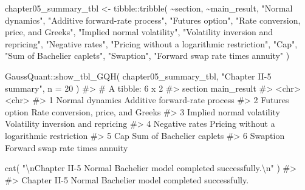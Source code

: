 \documentclass[
  letterpaper,
  DIV=11,
  numbers=noendperiod]{scrreprt}
\newenvironment{Shaded}{\begin{snugshade}}{\end{snugshade}}
\newcommand{\AttributeTok}[1]{\textcolor[rgb]{0.40,0.45,0.13}{#1}}
\newcommand{\CommentTok}[1]{\textcolor[rgb]{0.37,0.37,0.37}{#1}}
\newcommand{\DecValTok}[1]{\textcolor[rgb]{0.68,0.00,0.00}{#1}}
\newcommand{\FunctionTok}[1]{\textcolor[rgb]{0.28,0.35,0.67}{#1}}
\newcommand{\NormalTok}[1]{\textcolor[rgb]{0.00,0.23,0.31}{#1}}
\newcommand{\OtherTok}[1]{\textcolor[rgb]{0.00,0.23,0.31}{#1}}
\newcommand{\SpecialCharTok}[1]{\textcolor[rgb]{0.37,0.37,0.37}{#1}}
\newcommand{\StringTok}[1]{\textcolor[rgb]{0.13,0.47,0.30}{#1}}
\begin{document}
\begin{Shaded}
\begin{Highlighting}[]
\NormalTok{chapter05\_summary\_tbl }\OtherTok{\textless{}{-}}\NormalTok{ tibble}\SpecialCharTok{::}\FunctionTok{tribble}\NormalTok{(}
  \SpecialCharTok{\textasciitilde{}}\NormalTok{section,                    }\SpecialCharTok{\textasciitilde{}}\NormalTok{main\_result,}
  \StringTok{"Normal dynamics"}\NormalTok{,           }\StringTok{"Additive forward{-}rate process"}\NormalTok{,}
  \StringTok{"Futures option"}\NormalTok{,            }\StringTok{"Rate conversion, price, and Greeks"}\NormalTok{,}
  \StringTok{"Implied normal volatility"}\NormalTok{, }\StringTok{"Volatility inversion and repricing"}\NormalTok{,}
  \StringTok{"Negative rates"}\NormalTok{,            }\StringTok{"Pricing without a logarithmic restriction"}\NormalTok{,}
  \StringTok{"Cap"}\NormalTok{,                       }\StringTok{"Sum of Bachelier caplets"}\NormalTok{,}
  \StringTok{"Swaption"}\NormalTok{,                  }\StringTok{"Forward swap rate times annuity"}
\NormalTok{)}

\NormalTok{GaussQuant}\SpecialCharTok{::}\FunctionTok{show\_tbl\_GQH}\NormalTok{(}
\NormalTok{  chapter05\_summary\_tbl,}
  \StringTok{"Chapter II{-}5 summary"}\NormalTok{,}
  \AttributeTok{n =} \DecValTok{20}
\NormalTok{)}
\CommentTok{\#\textgreater{} \# A tibble: 6 x 2}
\CommentTok{\#\textgreater{}   section                   main\_result                              }
\CommentTok{\#\textgreater{}   \textless{}chr\textgreater{}                     \textless{}chr\textgreater{}                                    }
\CommentTok{\#\textgreater{} 1 Normal dynamics           Additive forward{-}rate process            }
\CommentTok{\#\textgreater{} 2 Futures option            Rate conversion, price, and Greeks       }
\CommentTok{\#\textgreater{} 3 Implied normal volatility Volatility inversion and repricing       }
\CommentTok{\#\textgreater{} 4 Negative rates            Pricing without a logarithmic restriction}
\CommentTok{\#\textgreater{} 5 Cap                       Sum of Bachelier caplets                 }
\CommentTok{\#\textgreater{} 6 Swaption                  Forward swap rate times annuity}

\FunctionTok{cat}\NormalTok{(}
  \StringTok{"}\SpecialCharTok{\textbackslash{}n}\StringTok{Chapter II{-}5 Normal Bachelier model completed successfully.}\SpecialCharTok{\textbackslash{}n}\StringTok{"}
\NormalTok{)}
\CommentTok{\#\textgreater{} }
\CommentTok{\#\textgreater{} Chapter II{-}5 Normal Bachelier model completed successfully.}
\end{Highlighting}
\end{Shaded}
\end{document}
